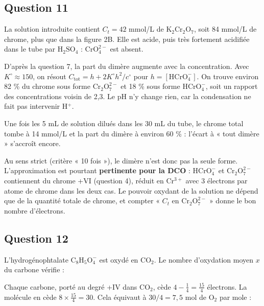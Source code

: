 \documentclass[11pt,a4paper]{article}
\newcommand{\equationajustee}[1]{%
  \sbox{\boiteequation}{$\displaystyle #1$}%
  \ifdim\wd\boiteequation>\linewidth
    \[\resizebox{\linewidth}{!}{\usebox{\boiteequation}}\]%
  \else
    \[#1\]%
  \fi}
\begin{document}
\hypertarget{question-11}{%
\subsection{Question 11}\label{question-11}}

La solution introduite contient \(C_t=42\) mmol/L de \(\mathrm{K_2Cr_2O_7}\), soit 84 mmol/L de chrome, plus que dans la figure 2B. Elle est acide, puis très fortement acidifiée dans le tube par \(\mathrm{H_2SO_4}\) : \(\mathrm{CrO_4^{2-}}\) est absent.

D'après la question 7, la part du dimère augmente avec la concentration. Avec \(K^\circ\approx150\), on résout \(C_{\text{tot}}=h+2K^\circ h^2/c^\circ\) pour \(h=[\mathrm{HCrO_4^-}]\). On trouve environ 82 \% du chrome sous forme \(\mathrm{Cr_2O_7^{2-}}\) et 18 \% sous forme \(\mathrm{HCrO_4^-}\), soit un rapport des concentrations voisin de 2,3. Le pH n'y change rien, car la condensation ne fait pas intervenir H\(^+\).

Une fois les 5 mL de solution dilués dans les 30 mL du tube, le chrome total tombe à 14 mmol/L et la part du dimère à environ 60 \% : l'écart à « tout dimère » s'accroît encore.

Au sens strict (critère « 10 fois »), le dimère n'est donc pas la seule forme. L'approximation est pourtant \textbf{pertinente pour la DCO} : \(\mathrm{HCrO_4^-}\) et \(\mathrm{Cr_2O_7^{2-}}\) contiennent du chrome +VI (question 4), réduit en Cr\(^{3+}\) avec 3 électrons par atome de chrome dans les deux cas. Le pouvoir oxydant de la solution ne dépend que de la quantité totale de chrome, et compter « \(C_t\) en \(\mathrm{Cr_2O_7^{2-}}\) » donne le bon nombre d'électrons.

\hypertarget{question-12}{%
\subsection{Question 12}\label{question-12}}

L'hydrogénophtalate \(\mathrm{C_8H_5O_4^-}\) est oxydé en CO\(_2\). Le nombre d'oxydation moyen \(x\) du carbone vérifie :

\equationajustee{\begin{aligned}
8x+5\times(+1)+4\times(-2)&=-1\\
x&=+\tfrac14
\end{aligned}}

Chaque carbone, porté au degré +IV dans CO\(_2\), cède \(4-\tfrac14=\tfrac{15}{4}\) électrons. La molécule en cède \(8\times\tfrac{15}{4}=30\). Cela équivaut à \(30/4=7{,}5\) mol de O\(_2\) par mole :
\end{document}
